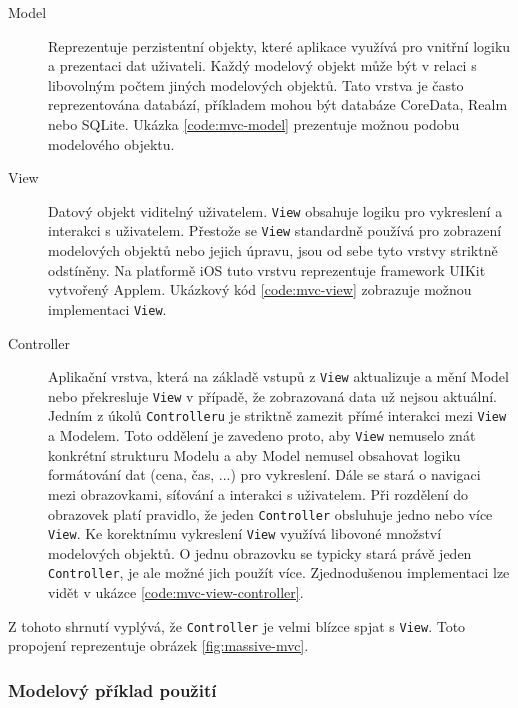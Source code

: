 \begin{description}
  \item[Model] Reprezentuje perzistentní objekty, které aplikace využívá pro vnitřní logiku a prezentaci dat uživateli.
  Každý modelový objekt může být v relaci s libovolným počtem jiných modelových objektů.
  Tato vrstva je často reprezentována databází, příkladem mohou být databáze CoreData, Realm nebo SQLite.
  Ukázka \ref{code:mvc-model} prezentuje možnou podobu modelového objektu.

  \item[View] Datový objekt viditelný uživatelem. \texttt{View} obsahuje logiku pro vykreslení a interakci s uživatelem.
  Přestože se \texttt{View} standardně používá pro zobrazení modelových objektů nebo jejich úpravu, jsou od sebe tyto vrstvy striktně odstíněny.
  Na platformě iOS tuto vrstvu reprezentuje framework UIKit vytvořený Applem.
  Ukázkový kód \ref{code:mvc-view} zobrazuje možnou implementaci \texttt{View}.

  \item[Controller] Aplikační vrstva, která na základě vstupů z \texttt{View} aktualizuje a mění Model nebo překresluje \texttt{View} v případě, že zobrazovaná data už nejsou aktuální.
  Jedním z úkolů \texttt{Controlleru} je striktně zamezit přímé interakci mezi \texttt{View} a Modelem.
  Toto oddělení je zavedeno proto, aby \texttt{View} nemuselo znát konkrétní strukturu Modelu a aby Model nemusel obsahovat logiku formátování dat (cena, čas, ...) pro vykreslení.
  Dále se stará o navigaci mezi obrazovkami, síťování a interakci s uživatelem.
  Při rozdělení do obrazovek platí pravidlo, že jeden \texttt{Controller} obsluhuje jedno nebo více \texttt{View}.
  Ke korektnímu vykreslení \texttt{View} využívá libovoné množství modelových objektů.
  O jednu obrazovku se typicky stará právě jeden \texttt{Controller}, je ale možné jich použít více.
  Zjednodušenou implementaci lze vidět v ukázce \ref{code:mvc-view-controller}.
\end{description}

Z tohoto shrnutí vyplývá, že \texttt{Controller} je velmi blízce spjat s \texttt{View}. Toto propojení reprezentuje obrázek \ref{fig:massive-mvc}.

\subsubsection*{Modelový příklad použití}

